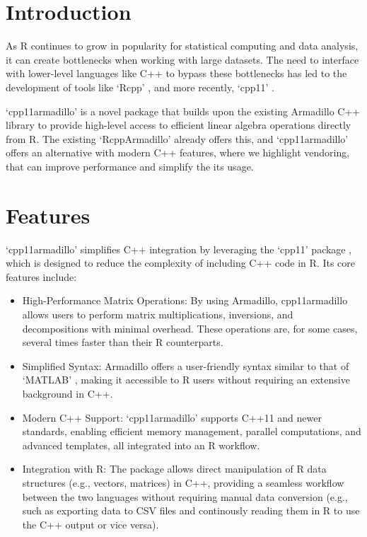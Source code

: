 \documentclass[
  10pt,
  letterpaper,
]{article}
\begin{document}
\linenumbers

\section{Introduction}\label{introduction}

As R continues to grow in popularity for statistical computing and data
analysis, it can create bottlenecks when working with large datasets.
The need to interface with lower-level languages like C++ to bypass
these bottlenecks has led to the development of tools like `Rcpp'
\citep{eddelbuettel2011}, and more recently, `cpp11' \citep{cpp11}.

`cpp11armadillo' is a novel package that builds upon the existing
Armadillo C++ library \citep{sanderson2016} to provide high-level access
to efficient linear algebra operations directly from R. The existing
`RcppArmadillo' \citep{eddelbuettel2014} already offers this, and
`cpp11armadillo' offers an alternative with modern C++ features, where
we highlight vendoring, that can improve performance and simplify the
its usage.

\section{Features}\label{features}

`cpp11armadillo' simplifies C++ integration by leveraging the `cpp11'
package \citep{cpp11}, which is designed to reduce the complexity of
including C++ code in R. Its core features include:

\begin{itemize}
\item
  High-Performance Matrix Operations: By using Armadillo, cpp11armadillo
  allows users to perform matrix multiplications, inversions, and
  decompositions with minimal overhead. These operations are, for some
  cases, several times faster than their R counterparts.
\item
  Simplified Syntax: Armadillo offers a user-friendly syntax similar to
  that of `MATLAB' \citep{sanderson2016}, making it accessible to R
  users without requiring an extensive background in C++.
\item
  Modern C++ Support: `cpp11armadillo' supports C++11 and newer
  standards, enabling efficient memory management, parallel
  computations, and advanced templates, all integrated into an R
  workflow.
\item
  Integration with R: The package allows direct manipulation of R data
  structures (e.g., vectors, matrices) in C++, providing a seamless
  workflow between the two languages without requiring manual data
  conversion (e.g., such as exporting data to CSV files and continously
  reading them in R to use the C++ output or vice versa).
\end{itemize}
\end{document}
